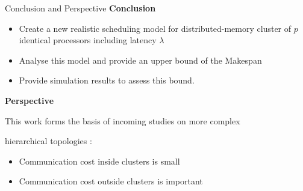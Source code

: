 \documentclass{beamer}
\begin{document}
    \begin{frame}{Conclusion and Perspective}
        \textbf{Conclusion}
            \begin{itemize}
                \item Create a new realistic scheduling model for distributed-memory cluster of $p$ identical processors including latency $\lambda$
                \item Analyse this model and provide an upper bound of the Makespan  
                \item Provide simulation results to assess this bound. 
            \end{itemize}

            \textbf{Perspective}

            \hspace{0.3cm}    This work forms the basis of incoming studies on more complex

            \hspace{0.3cm} hierarchical topologies :

            \begin{itemize}
                \item Communication cost inside clusters is small
                \item Communication cost outside clusters is important
            \end{itemize}
    \end{frame}






\end{document}
